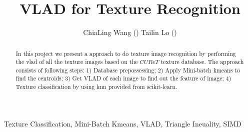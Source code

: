 \documentclass[final,leqno,onefignum,onetabnum]{siamltexmm}
\title {VLAD for Texture Recognition}
\begin{document}
\author{ChiaLing Wang () Tailin Lo () }


\maketitle
\newcommand{\slugmaster}{%
\slugger{siads}{xxxx}{xx}{x}{x--x}}%

\begin{abstract}
In this project we present a approach to do texture image recognition by performing the vlad of all the texture images based on the \(CUReT\) texture database. The approach consists of following steps: 1) Database prepossessing; 2) Apply Mini-batch kmeans to find the centroids; 3) Get VLAD of each image to find out the feature of image; 4) Texture classification by using knn provided from scikit-learn. 

\end{abstract}

\begin{keywords}
Texture Classification, Mini-Batch Kmeans, VLAD, Triangle Ineuality, SIMD   	
\end{keywords}



\pagestyle{myheadings}
\thispagestyle{plain}
\end{document}

